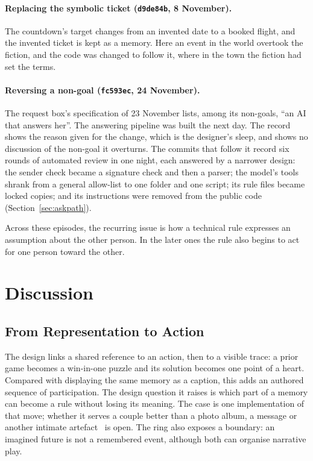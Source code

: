 \documentclass[sigconf,nonacm]{acmart}
\newcommand{\code}[1]{\textnormal{\texttt{\small #1}}}
\begin{document}
\paragraph{Replacing the symbolic ticket (\code{d9de84b}, 8 November).}
The countdown's target changes from an invented date to a booked flight, and the invented ticket
is kept as a memory. Here an event in the world overtook the fiction, and the code was changed
to follow it, where in the town the fiction had set the terms.

\paragraph{Reversing a non-goal (\code{fc593ec}, 24 November).}
The request box's specification of 23 November lists, among its non-goals, ``an AI that answers
her''. The answering pipeline was built the next day. The record shows the reason given for the
change, which is the designer's sleep, and shows no discussion of the non-goal it overturns. The
commits that follow it record six rounds of automated review in one night, each answered by a
narrower design: the sender check became a signature check and then a parser; the model's tools
shrank from a general allow-list to one folder and one script; its rule files became locked
copies; and its instructions were removed from the public code (Section~\ref{sec:askpath}).

Across these episodes, the recurring issue is how a technical rule expresses an assumption
about the other person. In the later ones the rule also begins to act for one person toward
the other.


\section{Discussion}\label{sec:discussion}


\subsection{From Representation to Action}
The design links a shared reference to an action, then to a visible trace: a prior game becomes
a win-in-one puzzle and its solution becomes one point of a heart. Compared with displaying the
same memory as a caption, this adds an authored sequence of participation. The design question
it raises is which part of a memory can become a rule without losing its meaning. The case is one
implementation of that move; whether it serves a couple better than a photo album, a message or
another intimate artefact~\cite{hassenzahl2012love,kirk2016ritual} is open.
The ring also exposes a boundary: an imagined future is not a remembered event, although both
can organise narrative play.
\end{document}
